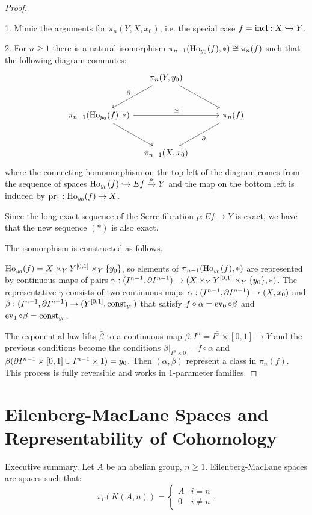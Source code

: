 \begin{proof}\ 

1. Mimic the arguments for $\pi_n(Y,X,x_0)$, i.e. the special case $f=\operatorname{incl}:X\hookrightarrow Y$.

2. For $n\geq1$ there is a natural isomorphism $\pi_{n-1}(\operatorname{Ho}_{y_0}(f),*)\cong\pi_n(f)$ such that the following diagram commutes:
\[
\begin{tikzcd}[column sep={8em,between origins},row sep=large]
& \pi_n(Y,y_0) \arrow[dl,"\de"'] \arrow[dr] & \\
\pi_\ni(\ho_{y_0}(f),*) \arrow[dr] \arrow[rr,"\cong"] && \pi_n(f) \arrow[dl,"\de"] \\
 & \pi_\ni(X,x_0) &
\end{tikzcd}
\]
where the connecting homomorphism on the top left of the diagram comes from the sequence of spaces $\operatorname{Ho}_{y_0}(f)\hookrightarrow Ef\xrightarrow{p} Y$ and the map on the bottom left is induced by $\operatorname{pr}_1:\operatorname{Ho}_{y_0}(f)\to X$.

Since the long exact sequence of the Serre fibration $p:Ef\to Y$ is exact, we have that the new sequence $(*)$ is also exact.

The isomorphism is constructed as follows.

$\operatorname{Ho}_{y_0}(f)=X\times_Y Y^{[0,1]}\times_Y\{y_0\}$, so elements of $\pi_{n-1}(\operatorname{Ho}_{y_0}(f),*)$ are represented by continuous maps of pairs $\gamma:(I^{n-1},\partial I^{n-1})\to (X\times_Y Y^{[0,1]}\times_Y\{y_0\},*)$. The representative $\gamma$ consists of two continuous maps $\alpha:(I^{n-1},\partial I^{n-1})\to(X,x_0)$ and $\bar\beta:(I^{n-1},\partial I^{n-1})\to(Y^{[0,1]},\operatorname{const}_{y_0})$ that satisfy $f\circ\alpha=\operatorname{ev}_0\circ\bar\beta$ and $\operatorname{ev}_1\circ\bar\beta=\operatorname{const}_{y_0}$.

The exponential law lifts $\bar\beta$ to a continuous map $\beta:I^n=I^\ni\times[0,1]\to Y$ and the previous conditions become the conditions $\beta|_{I^\ni\times0}=f\circ\alpha$ and $\beta(\partial I^{n-1}\times[0,1]\cup I^{n-1}\times1)=y_0$. Then $(\alpha,\beta)$ represent a class in $\pi_n(f)$. This process is fully reversible and works in $1$-parameter families.
\end{proof}

\chapter{Eilenberg-MacLane Spaces and Representability of Cohomology}

Executive summary. Let $A$ be an abelian group, $n\geq1$.
Eilenberg-MacLane spaces are spaces such that:
\[\pi_i(K(A,n))=\begin{cases}
A & i=n\\
0 & i\neq n
\end{cases}.\]

